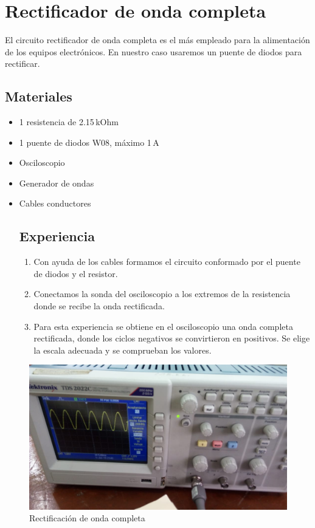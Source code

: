 \documentclass[a4paper,12pt]{report}
\begin{document}
\section{Rectificador de onda completa}
El circuito rectificador de onda completa es el más empleado para la alimentación de los equipos electrónicos. En nuestro caso usaremos un puente de diodos para rectificar.
\subsection{Materiales}
\begin{itemize}
\item 1 resistencia de 2.15$\,$kOhm
\item 1 puente de diodos W08, máximo 1$\,$A
\item Osciloscopio
\item Generador de ondas
\item Cables conductores
\subsection{Experiencia}
\begin{enumerate}
\item Con ayuda de los cables formamos el circuito conformado por el puente de diodos y el resistor.
\item Conectamos la sonda del osciloscopio a los extremos de la resistencia donde se recibe la onda rectificada.
\item Para esta experiencia se obtiene en el osciloscopio una onda completa rectificada, donde los ciclos negativos se convirtieron en positivos. Se elige la escala adecuada y se comprueban los valores.
\end{enumerate}
\end{itemize}
\begin{figure}[H]
\begin{center}
\includegraphics[scale=0.42]{kesk2.jpeg}
\caption{Rectificación de onda completa}
\end{center}
\end{figure}
\end{document}
